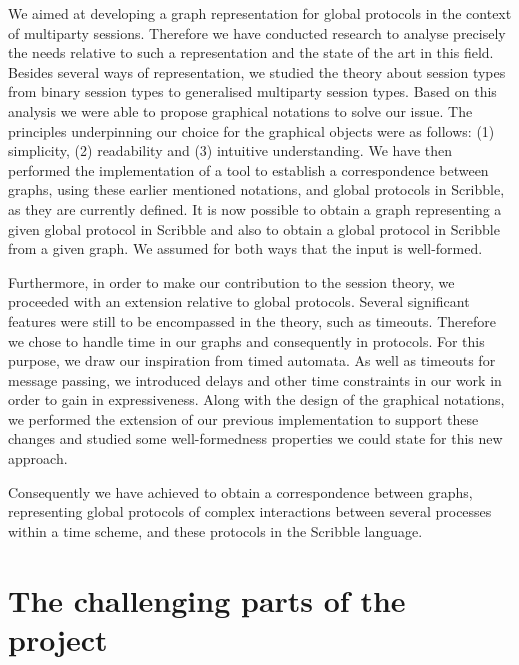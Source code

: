 \documentclass[a4paper,11pt,twoside]{report}
\begin{document}
We aimed at developing a graph representation for global protocols in the context of multiparty sessions. Therefore we have conducted research to analyse precisely the needs relative to such a representation and the state of the art in this field. Besides several ways of representation, we studied the theory about session types from binary session types to generalised multiparty session types. Based on this analysis we were able to propose graphical notations to solve our issue. The principles underpinning our choice for the graphical objects were as follows: (1) simplicity, (2) readability and (3) intuitive understanding. We have then performed the implementation of a tool to establish a correspondence between graphs, using these earlier mentioned notations, and global protocols in Scribble, as they are currently defined. It is now possible to obtain a graph representing a given global protocol in Scribble and also to obtain a global protocol in Scribble from a given graph. We assumed for both ways that the input is well-formed.

Furthermore, in order to make our contribution to the session theory, we proceeded with an extension relative to global protocols. Several significant features were still to be encompassed in the theory, such as timeouts. Therefore we chose to handle time in our graphs and consequently in protocols. For this purpose, we draw our inspiration from timed automata. As well as timeouts for message passing, we introduced delays and other time constraints in our work in order to gain in expressiveness. Along with the design of the graphical notations, we performed the extension of our previous implementation to support these changes and studied some well-formedness properties we could state for this new approach.

Consequently we have achieved to obtain a correspondence between graphs, representing global protocols of complex interactions between several processes within a time scheme, and these protocols in the Scribble language.



\section*{The challenging parts of the project}
\end{document}
